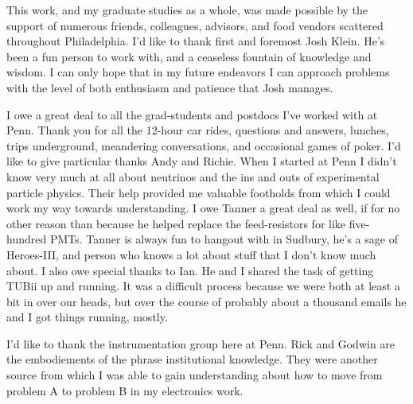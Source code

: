 
\begin{acknowledgements}
    This work, and my graduate studies as a whole, was made possible
    by the support of numerous friends, colleagues, advisors, and food
    vendors scattered throughout Philadelphia.
    I'd like to thank first and foremost Josh Klein.
    He's been a fun person to work with, and a ceaseless fountain
    of knowledge and wisdom.
    I can only hope that in my future endeavors I can approach problems with
    the level of both enthusiasm and patience that Josh manages.

    I owe a great deal to all the grad-students and postdocs I've
    worked with at Penn.
    Thank you for all the 12-hour car rides, questions and answers,
    lunches, trips underground, meandering conversations,
    and occasional games of poker.
    I'd like to give particular thanks Andy and Richie. When I started at Penn
    I didn't know very much at all about neutrinos and the
    ins and outs of experimental particle physics.
    Their help provided me valuable footholds from which I could
    work my way towards understanding.
    I owe Tanner a great deal as well,
    if for no other reason than because he helped replace the feed-resistors
    for like five-hundred PMTs.
    Tanner is always fun to hangout with in Sudbury, he's a sage of Heroes-III, and
    person who knows a lot about stuff that I don't know much about.
    I also owe special thanks to Ian. He and I shared the  task of getting
    TUBii up and running.
    It was a difficult process because we were both at least a bit in over our
    heads, but over the course of probably about a thousand emails he and I
    got things running, mostly.


    I'd like to thank the instrumentation group here at Penn.
    Rick and Godwin are the embodiements of the phrase
    institutional knowledge.
    They were another source from which I was able to gain
    understanding about how to move from problem A to problem B in my electronics
    work.

     


\end{acknowledgements}




